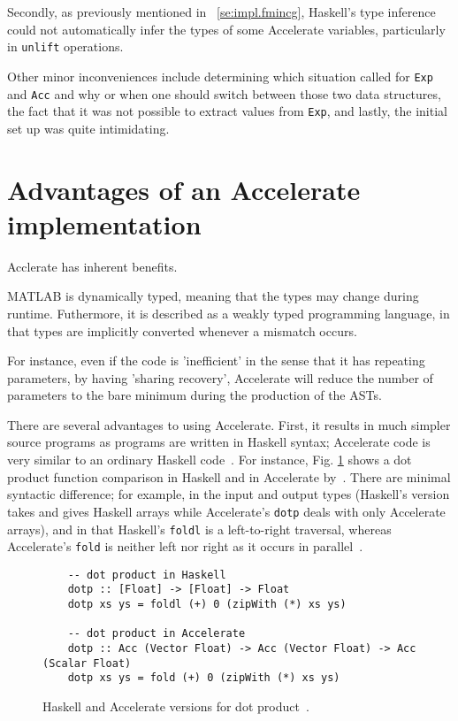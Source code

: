 Secondly, as previously mentioned in ~\ref{se:impl.fmincg}, Haskell's type inference could not automatically infer the types of some Accelerate variables, particularly in \texttt{unlift} operations. 

Other minor inconveniences include determining which situation called for \texttt{Exp} and \texttt{Acc} and why or when one should switch between those two data structures, the fact that it was not possible to extract values from \texttt{Exp}, and lastly, the initial set up was quite intimidating.

\section{Advantages of an Accelerate implementation} \label{se:eval.advantages}

Acclerate has inherent benefits.

MATLAB is dynamically typed, meaning that the types may change during runtime. Futhermore, it is described as a weakly typed programming language, in that types are implicitly converted whenever a mismatch occurs.

For instance, even if the code is 'inefficient' in the sense that it has repeating parameters, by having 'sharing recovery', Accelerate will reduce the number of parameters to the bare minimum during the production of the ASTs.

There are several advantages to using Accelerate. First, it results in much simpler source programs as programs are written in Haskell syntax; Accelerate code is very similar to an ordinary Haskell code~\cite{Mar13}. For instance, Fig. \ref{fig:dotp} shows a dot product function comparison in Haskell and in Accelerate by~\cite{McD13}. There are minimal syntactic difference; for example, in the input and output types (Haskell's version takes and gives Haskell arrays while Accelerate's \texttt{dotp} deals with only Accelerate arrays), and in that Haskell's \texttt{foldl} is a left-to-right traversal, whereas Accelerate's \texttt{fold} is neither left nor right as it occurs in parallel~\cite{McD13}.

\begin{figure}
  \begin{lstlisting}
    -- dot product in Haskell
    dotp :: [Float] -> [Float] -> Float
    dotp xs ys = foldl (+) 0 (zipWith (*) xs ys)
           
    -- dot product in Accelerate
    dotp :: Acc (Vector Float) -> Acc (Vector Float) -> Acc (Scalar Float)
    dotp xs ys = fold (+) 0 (zipWith (*) xs ys)
  \end{lstlisting}
  \caption{Haskell and Accelerate versions for dot product~\cite{McD13}.}
  \label{fig:dotp}
\end{figure}

